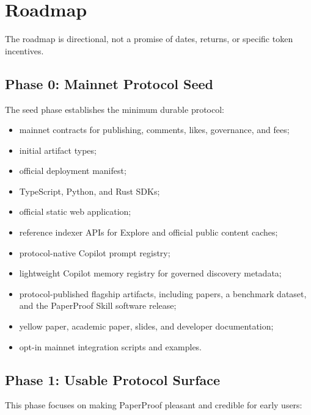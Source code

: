 \documentclass[11pt]{article}
\begin{document}
\section{Roadmap}

The roadmap is directional, not a promise of dates, returns, or specific token
incentives.

\subsection{Phase 0: Mainnet Protocol Seed}

The seed phase establishes the minimum durable protocol:

\begin{itemize}[leftmargin=*]
  \item mainnet contracts for publishing, comments, likes, governance, and fees;
  \item initial artifact types;
  \item official deployment manifest;
  \item TypeScript, Python, and Rust SDKs;
  \item official static web application;
  \item reference indexer APIs for Explore and official public content caches;
  \item protocol-native Copilot prompt registry;
  \item lightweight Copilot memory registry for governed discovery metadata;
  \item protocol-published flagship artifacts, including papers, a benchmark
        dataset, and the PaperProof Skill software release;
  \item yellow paper, academic paper, slides, and developer documentation;
  \item opt-in mainnet integration scripts and examples.
\end{itemize}

\subsection{Phase 1: Usable Protocol Surface}

This phase focuses on making PaperProof pleasant and credible for early users:
\end{document}
